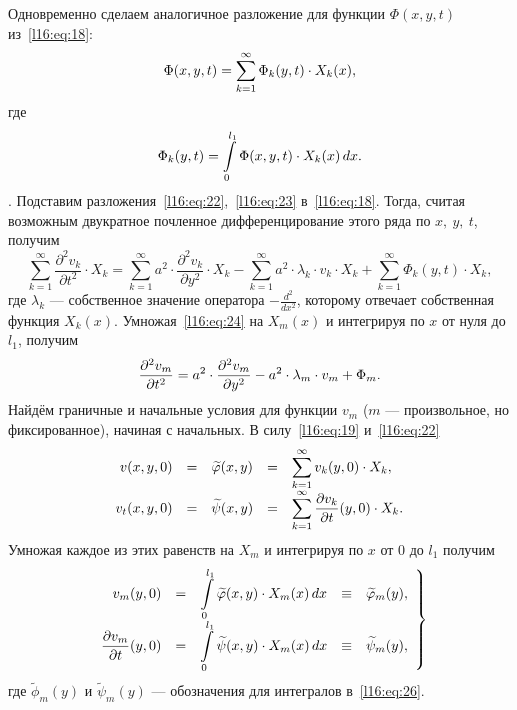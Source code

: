 \documentclass[12pt,a4paper,openany,fleqn]{book}
\newcommand{\dder}[2]{\ensuremath{\frac{d^2#1}{d#2^2}}}
\newcommand{\pder}[2]{\ensuremath{\frac{\partial#1}{\partial#2}}}
\newcommand{\pdder}[2]{\ensuremath{\frac{\partial^2#1}{\partial#2^2}}}
\theoremstyle{definition}
\begin{document}
	Одновременно сделаем аналогичное разложение для функции $\Phi(x,y,t)$ из~\eqref{l16:eq:18}:
	\begin{equation}\label{l16:eq:23}
		\hfill\Phi(x,y,t)=\sum\limits_{k=1}^{\infty}\Phi_k(y,t)\cdot X_k(x),\hfill
	\end{equation}
	где 
	\begin{equation*}
		\hfill\Phi_k(y,t)=\int\limits_0^{l_1}\Phi(x,y,t)\cdot X_k(x)\,dx.\hfill
	\end{equation*}.
	Подставим разложения~\eqref{l16:eq:22},~\eqref{l16:eq:23} в~\eqref{l16:eq:18}. Тогда, считая возможным двукратное почленное дифференцирование этого ряда по $x,\ y,\ t$, получим 
	\begin{equation}\label{l16:eq:24}
		\sum\limits_{k=1}^{\infty}\pdder{v_k}{t}\cdot X_k=\sum\limits_{k=1}^{\infty}a^2\cdot\pdder{v_k}{y}\cdot X_k-\sum\limits_{k=1}^{\infty}a^2\cdot\lambda_k\cdot v_k\cdot X_k+\sum\limits_{k=1}^{\infty}\Phi_k(y,t)\cdot X_k,
	\end{equation}
	где $\lambda_k$ --- собственное значение оператора $-\displaystyle\dder{}{x}$, которому отвечает собственная функция $X_k(x)$. Умножая~\eqref{l16:eq:24} на $X_m(x)$ и интегрируя по $x$ от нуля до $l_1$, получим
	\begin{equation}\label{l16:eq:25}
		\hfill\pdder{v_m}{t}=a^2\cdot\pdder{v_m}{y}-a^2\cdot\lambda_m\cdot v_m+\Phi_m.\hfill
	\end{equation} 
	Найдём граничные и начальные условия для функции $v_m$ ($m$ --- произвольное, но фиксированное), начиная с начальных. В силу~\eqref{l16:eq:19} и~\eqref{l16:eq:22} 
	\begin{equation*}
		\hfill\begin{array}{rcccl}
			v(x,y,0)&=&\widetilde{\phi}(x,y)&=&\displaystyle\sum\limits_{k=1}^{\infty}v_k(y,0)\cdot X_k,\\
			v_t(x,y,0)&=&\widetilde{\psi}(x,y)&=&\displaystyle\sum\limits_{k=1}^{\infty}\pder{v_k}{t}(y,0)\cdot X_k.
		\end{array}\hfill
	\end{equation*}
	Умножая каждое из этих равенств на $X_m$ и интегрируя по $x$ от $0$ до $l_1$ получим 
	\begin{equation}\label{l16:eq:26}
		\hfill\left.\begin{array}{rcccl}
			v_m(y,0)&=&\displaystyle\int\limits_0^{l_1}\widetilde{\phi}(x,y)\cdot X_m(x)\,dx& \equiv& \widetilde{\phi}_m(y),\\
			\displaystyle\pder{v_m}{t}(y,0)&=&\displaystyle\int\limits_0^{l_1}\widetilde{\psi}(x,y)\cdot X_m(x)\,dx&\equiv&\widetilde{\psi}_m(y),
		\end{array}\right\}\hfill
	\end{equation}
	где $\widetilde{\phi}_m(y)$ и $\widetilde{\psi}_m(y)$ --- обозначения для интегралов в~\eqref{l16:eq:26}.
	
\end{document}
